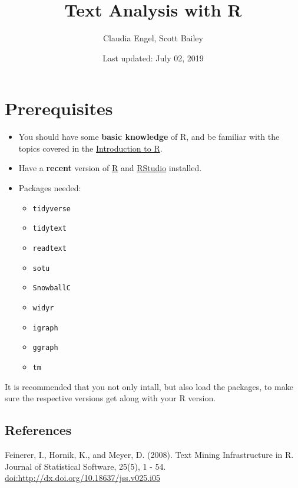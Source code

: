 \documentclass[]{book}
\title{Text Analysis with R}
\author{Claudia Engel, Scott Bailey}
\date{Last updated: July 02, 2019}
\providecommand{\tightlist}{%
  \setlength{\itemsep}{0pt}\setlength{\parskip}{0pt}}
\begin{document}
\maketitle

{
\setcounter{tocdepth}{1}
\tableofcontents
}
\hypertarget{prerequisites}{%
\chapter*{Prerequisites}\label{prerequisites}}

\begin{itemize}
\item
  You should have some \textbf{basic knowledge} of R, and be familiar with the topics covered in the \href{https://cengel.github.io/R-intro/}{Introduction to R}.
\item
  Have a \textbf{recent} version of \href{https://cran.r-project.org/}{R} and \href{https://www.rstudio.com/}{RStudio} installed.
\item
  Packages needed:

  \begin{itemize}
  \tightlist
  \item
    \texttt{tidyverse}
  \item
    \texttt{tidytext}
  \item
    \texttt{readtext}
  \item
    \texttt{sotu}
  \item
    \texttt{SnowballC}
  \item
    \texttt{widyr}
  \item
    \texttt{igraph}
  \item
    \texttt{ggraph}
  \item
    \texttt{tm}
  \end{itemize}
\end{itemize}

It is recommended that you not only intall, but also load the packages, to make sure the respective versions get along with your R version.

\hypertarget{references}{%
\section*{References}\label{references}}

Feinerer, I., Hornik, K., and Meyer, D. (2008). Text Mining Infrastructure in R. Journal of Statistical Software, 25(5), 1 - 54. \url{doi:http://dx.doi.org/10.18637/jss.v025.i05}
\end{document}
